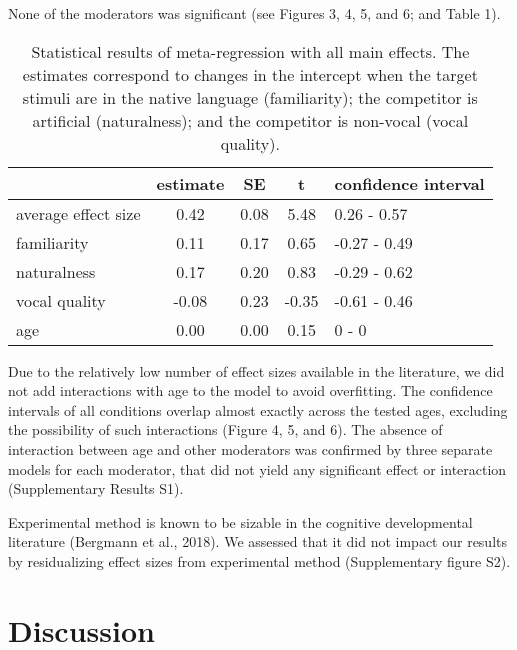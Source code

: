 \documentclass[man]{apa6}
\begin{document}
None of the moderators was significant (see Figures 3, 4, 5, and 6; and Table 1).

\begin{table}[tbp]

\begin{center}
\begin{threeparttable}

\caption{\label{tab:Table1}Statistical results of meta-regression with all main effects. The estimates correspond to changes in the intercept when the target stimuli are in the native language (familiarity); the competitor is artificial (naturalness); and the competitor is non-vocal (vocal quality).}

\begin{tabular}{lcccl}
\toprule
 & estimate & SE & t & confidence interval\\
\midrule
average effect size & 0.42 & 0.08 & 5.48 & 0.26 - 0.57\\
familiarity & 0.11 & 0.17 & 0.65 & -0.27 - 0.49\\
naturalness & 0.17 & 0.20 & 0.83 & -0.29 - 0.62\\
vocal quality & -0.08 & 0.23 & -0.35 & -0.61 - 0.46\\
age & 0.00 & 0.00 & 0.15 & 0 - 0\\
\bottomrule
\end{tabular}

\end{threeparttable}
\end{center}

\end{table}

Due to the relatively low number of effect sizes available in the literature, we did not add interactions with age to the model to avoid overfitting. The confidence intervals of all conditions overlap almost exactly across the tested ages, excluding the possibility of such interactions (Figure 4, 5, and 6). The absence of interaction between age and other moderators was confirmed by three separate models for each moderator, that did not yield any significant effect or interaction (Supplementary Results S1).

Experimental method is known to be sizable in the cognitive developmental literature (Bergmann et al., 2018). We assessed that it did not impact our results by residualizing effect sizes from experimental method (Supplementary figure S2).

\hypertarget{discussion}{%
\section{Discussion}\label{discussion}}
\end{document}
